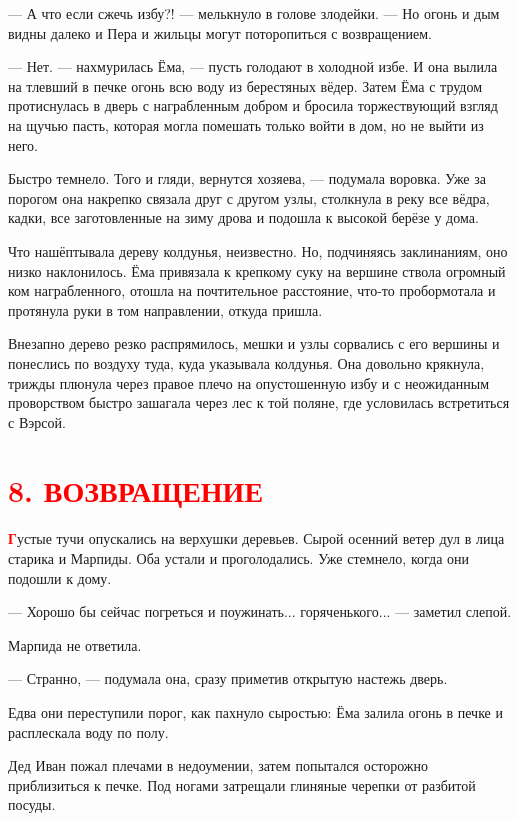 \documentclass[12pt, a4paper, openany]{book}
\begin{document}
	— А что если сжечь избу?! — мелькнуло в голове злодейки. — Но огонь и дым видны далеко и Пера и жильцы могут поторопиться с возвращением.
	
	— Нет. — нахмурилась Ёма, — пусть голодают в холодной избе. И она вылила на тлевший в печке огонь всю воду из берестяных вёдер. Затем Ёма с трудом протиснулась в дверь с награбленным добром и бросила торжествующий взгляд на щучью пасть, которая могла помешать только войти в дом, но не выйти из него.
	
	Быстро темнело. Того и гляди, вернутся хозяева, — подумала воровка. Уже за порогом она накрепко связала друг с другом узлы, столкнула в реку все вёдра, кадки, все заготовленные на зиму дрова и подошла к высокой берёзе у дома.
	
	Что нашёптывала дереву колдунья, неизвестно. Но, подчиняясь заклинаниям, оно низко наклонилось. Ёма привязала к крепкому суку на вершине ствола огромный ком награбленного, отошла на почтительное расстояние, что-то пробормотала и протянула руки в том направлении, откуда пришла.
	
	Внезапно дерево резко распрямилось, мешки и узлы сорвались с его вершины и понеслись по воздуху туда, куда указывала колдунья. Она довольно крякнула, трижды плюнула через правое плечо на опустошенную избу и с неожиданным проворством быстро зашагала через лес к той поляне, где условилась встретиться с Вэрсой.
	
	\section[8. Возвращение]{\center \textcolor{red}{8. ВОЗВРАЩЕНИЕ}}
	
\lettrine[findent=0pt]{\textbf{\textcolor{red}{Г}}}{}устые тучи опускались на верхушки деревьев. Сырой осенний ветер дул в лица старика и Марпиды. Оба устали и проголодались. Уже стемнело, когда они подошли к дому.
	
	— Хорошо бы сейчас погреться и поужинать... горяченького... — заметил слепой.
	
	Марпида не ответила.
	
	— Странно, — подумала она, сразу приметив открытую настежь дверь.
	
	Едва они переступили порог, как пахнуло сыростью: Ёма залила огонь в печке и расплескала воду по полу.
	
	Дед Иван пожал плечами в недоумении, затем попытался осторожно приблизиться к печке. Под ногами затрещали глиняные черепки от разбитой посуды.
	
\end{document}
